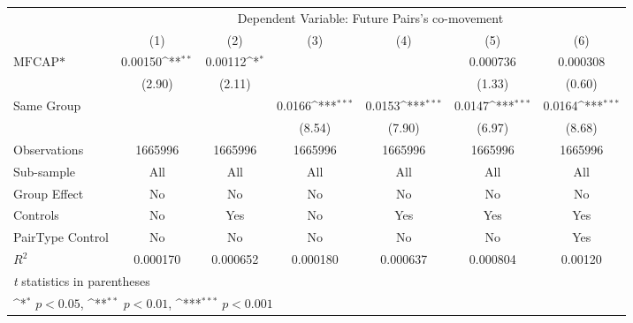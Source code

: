{
\def\sym#1{\ifmmode^{#1}\else\(^{#1}\)\fi}
\begin{tabular}{l*{6}{c}}
\hline\hline
                &\multicolumn{6}{c}{Dependent Variable: Future Pairs's co-movement}                                               \\\cmidrule(lr){2-7}
                &\multicolumn{1}{c}{(1)}         &\multicolumn{1}{c}{(2)}         &\multicolumn{1}{c}{(3)}         &\multicolumn{1}{c}{(4)}         &\multicolumn{1}{c}{(5)}         &\multicolumn{1}{c}{(6)}         \\
\hline
$ \text{MFCAP*} $&  0.00150\sym{**} &  0.00112\sym{*}  &                  &                  & 0.000736         & 0.000308         \\
                &   (2.90)         &   (2.11)         &                  &                  &   (1.33)         &   (0.60)         \\
[1em]
Same Group      &                  &                  &   0.0166\sym{***}&   0.0153\sym{***}&   0.0147\sym{***}&   0.0164\sym{***}\\
                &                  &                  &   (8.54)         &   (7.90)         &   (6.97)         &   (8.68)         \\
\hline
Observations    &  1665996         &  1665996         &  1665996         &  1665996         &  1665996         &  1665996         \\
Sub-sample      &      All         &      All         &      All         &      All         &      All         &      All         \\
Group Effect    &       No         &       No         &       No         &       No         &       No         &       No         \\
Controls        &       No         &      Yes         &       No         &      Yes         &      Yes         &      Yes         \\
PairType Control&       No         &       No         &       No         &       No         &       No         &      Yes         \\
$ R^2 $         & 0.000170         & 0.000652         & 0.000180         & 0.000637         & 0.000804         &  0.00120         \\
\hline\hline
\multicolumn{7}{l}{\footnotesize \textit{t} statistics in parentheses}\\
\multicolumn{7}{l}{\footnotesize \sym{*} \(p<0.05\), \sym{**} \(p<0.01\), \sym{***} \(p<0.001\)}\\
\end{tabular}
}
